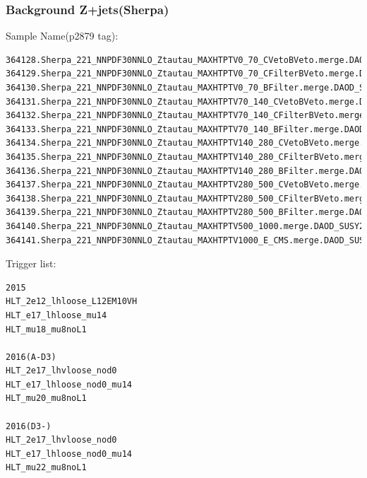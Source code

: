 \documentclass[mathserif,serif]{beamer}
\begin{document}
\begin{frame}[fragile]
\frametitle{Background Z+jets(Sherpa)}
\small
Sample Name(p2879 tag):
\tiny
\begin{verbatim}
364128.Sherpa_221_NNPDF30NNLO_Ztautau_MAXHTPTV0_70_CVetoBVeto.merge.DAOD_SUSY2.e5307_s2726_r7772_r7676_p2879
364129.Sherpa_221_NNPDF30NNLO_Ztautau_MAXHTPTV0_70_CFilterBVeto.merge.DAOD_SUSY2.e5307_s2726_r7772_r7676_p2879
364130.Sherpa_221_NNPDF30NNLO_Ztautau_MAXHTPTV0_70_BFilter.merge.DAOD_SUSY2.e5307_s2726_r7772_r7676_p2879
364131.Sherpa_221_NNPDF30NNLO_Ztautau_MAXHTPTV70_140_CVetoBVeto.merge.DAOD_SUSY2.e5307_s2726_r7772_r7676_p2879
364132.Sherpa_221_NNPDF30NNLO_Ztautau_MAXHTPTV70_140_CFilterBVeto.merge.DAOD_SUSY2.e5307_s2726_r7772_r7676_p2879
364133.Sherpa_221_NNPDF30NNLO_Ztautau_MAXHTPTV70_140_BFilter.merge.DAOD_SUSY2.e5307_s2726_r7772_r7676_p2879
364134.Sherpa_221_NNPDF30NNLO_Ztautau_MAXHTPTV140_280_CVetoBVeto.merge.DAOD_SUSY2.e5307_s2726_r7772_r7676_p2879
364135.Sherpa_221_NNPDF30NNLO_Ztautau_MAXHTPTV140_280_CFilterBVeto.merge.DAOD_SUSY2.e5307_s2726_r7772_r7676_p2879
364136.Sherpa_221_NNPDF30NNLO_Ztautau_MAXHTPTV140_280_BFilter.merge.DAOD_SUSY2.e5307_s2726_r7772_r7676_p2879
364137.Sherpa_221_NNPDF30NNLO_Ztautau_MAXHTPTV280_500_CVetoBVeto.merge.DAOD_SUSY2.e5307_s2726_r7772_r7676_p2879
364138.Sherpa_221_NNPDF30NNLO_Ztautau_MAXHTPTV280_500_CFilterBVeto.merge.DAOD_SUSY2.e5313_s2726_r7772_r7676_p2879
364139.Sherpa_221_NNPDF30NNLO_Ztautau_MAXHTPTV280_500_BFilter.merge.DAOD_SUSY2.e5313_s2726_r7772_r7676_p2879
364140.Sherpa_221_NNPDF30NNLO_Ztautau_MAXHTPTV500_1000.merge.DAOD_SUSY2.e5307_s2726_r7772_r7676_p2879
364141.Sherpa_221_NNPDF30NNLO_Ztautau_MAXHTPTV1000_E_CMS.merge.DAOD_SUSY2.e5307_s2726_r7772_r7676_p2879
\end{verbatim}
\end{frame}

\begin{frame}[fragile]
\small
Trigger list:\\
\scriptsize
\begin{verbatim}
2015
HLT_2e12_lhloose_L12EM10VH
HLT_e17_lhloose_mu14
HLT_mu18_mu8noL1

2016(A-D3)
HLT_2e17_lhvloose_nod0
HLT_e17_lhloose_nod0_mu14
HLT_mu20_mu8noL1

2016(D3-)
HLT_2e17_lhvloose_nod0
HLT_e17_lhloose_nod0_mu14
HLT_mu22_mu8noL1
\end{verbatim}
\end{frame}
\end{document}
